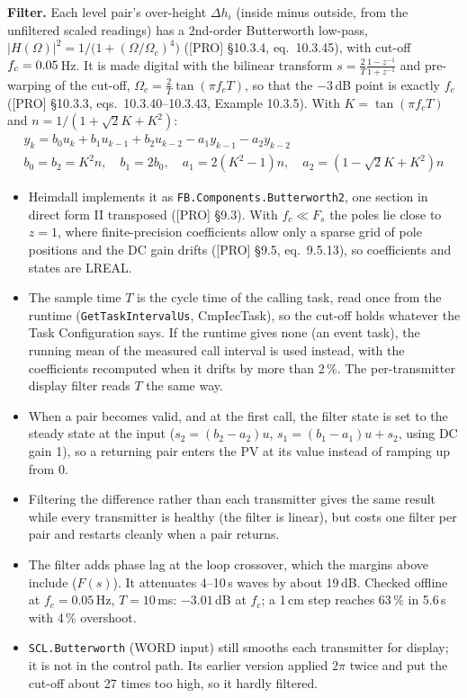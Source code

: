 \documentclass[11pt]{article}
\begin{document}
\textbf{Filter.} Each level pair's over-height $\Delta h_i$ (inside minus outside, from the
unfiltered scaled readings) has a 2nd-order Butterworth low-pass,
$|H(\Omega)|^2 = 1/\big(1+(\Omega/\Omega_c)^{4}\big)$ ([PRO] §10.3.4, eq.~10.3.45), with cut-off
$f_c = 0.05$\,Hz. It is made digital with the bilinear transform
$s = \frac{2}{T}\frac{1-z^{-1}}{1+z^{-1}}$ and pre-warping of the cut-off,
$\Omega_c = \frac{2}{T}\tan(\pi f_c T)$, so that the $-3$\,dB point is exactly $f_c$
([PRO] §10.3.3, eqs.~10.3.40--10.3.43, Example 10.3.5). With $K = \tan(\pi f_cT)$ and
$n = 1/(1+\sqrt2K+K^2)$:
\begin{gather}
y_k = b_0u_k + b_1u_{k-1} + b_2u_{k-2} - a_1y_{k-1} - a_2y_{k-2}\\
b_0=b_2=K^2n,\quad b_1=2b_0,\quad a_1=2(K^2-1)n,\quad a_2=(1-\sqrt2K+K^2)n \nonumber
\end{gather}
\begin{itemize}
  \item Heimdall implements it as \texttt{FB.Components.Butterworth2}, one section in direct form
        II transposed ([PRO] §9.3). With $f_c \ll F_s$ the poles lie close to $z=1$, where
        finite-precision coefficients allow only a sparse grid of pole positions and the DC gain
        drifts ([PRO] §9.5, eq.~9.5.13), so coefficients and states are LREAL.
  \item The sample time $T$ is the cycle time of the calling task, read once from the runtime
        (\texttt{GetTaskIntervalUs}, CmpIecTask), so the cut-off holds whatever the Task
        Configuration says. If the runtime gives none (an event task), the running mean of the
        measured call interval is used instead, with the coefficients recomputed when it drifts by
        more than 2\,\%. The per-transmitter display filter reads $T$ the same way.
  \item When a pair becomes valid, and at the first call, the filter state is set to the steady
        state at the input ($s_2 = (b_2-a_2)u$, $s_1 = (b_1-a_1)u + s_2$, using DC gain 1), so a
        returning pair enters the PV at its value instead of ramping up from 0.
  \item Filtering the difference rather than each transmitter gives the same result while every
        transmitter is healthy (the filter is linear), but costs one filter per pair and restarts
        cleanly when a pair returns.
  \item The filter adds phase lag at the loop crossover, which the margins above include
        ($F(s)$). It attenuates 4--10\,s waves by about 19\,dB. Checked offline at
        $f_c = 0.05$\,Hz, $T = 10$\,ms: $-3.01$\,dB at $f_c$; a 1\,cm step reaches 63\,\% in
        5.6\,s with 4\,\% overshoot.
  \item \texttt{SCL.Butterworth} (WORD input) still smooths each transmitter for display; it is not
        in the control path. Its earlier version applied $2\pi$ twice and put the cut-off about 27
        times too high, so it hardly filtered.
\end{itemize}
\end{document}
